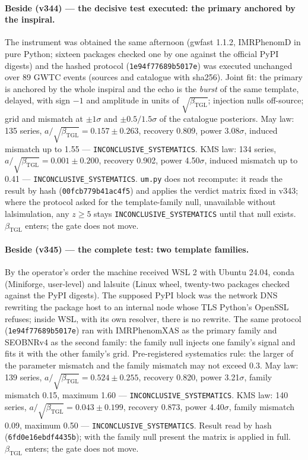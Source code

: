 \documentclass[11pt]{article}
\newcommand{\bTGL}{\beta_{\mathrm{TGL}}}\newcommand{\Msun}{M_{\odot}}\newcommand{\TGL}{\mathrm{TGL}}
\theoremstyle{definition}\newtheorem{deriv}{Derivation}
\begin{document}
\paragraph*{Beside (v344) --- the decisive test executed: the primary anchored by the inspiral.} The instrument was obtained the same afternoon (gwfast 1.1.2, IMRPhenomD in pure Python; sixteen packages checked one by one against the official PyPI digests) and the hashed protocol (\texttt{1e94f77689b5017e}) was executed unchanged over 89 GWTC events (sources and catalogue with sha256). Joint fit: the primary is anchored by the whole inspiral and the echo is the \emph{burst} of the same template, delayed, with sign $-1$ and amplitude in units of $\sqrt{\bTGL}$; injection nulls off-source; grid and mismatch at $\pm1\sigma$ and $\pm0.5/1.5\sigma$ of the catalogue posteriors. May law: 135 series, $a/\sqrt{\bTGL}=0.157\pm0.263$, recovery 0.809, power 3.08$\sigma$, induced mismatch up to 1.55 --- \texttt{INCONCLUSIVE\_SYSTEMATICS}. KMS law: 134 series, $a/\sqrt{\bTGL}=0.001\pm0.200$, recovery 0.902, power 4.50$\sigma$, induced mismatch up to 0.41 --- \texttt{INCONCLUSIVE\_SYSTEMATICS}. \texttt{um.py} does not recompute: it reads the result by hash (\texttt{00fcb779b41ac4f5}) and applies the verdict matrix fixed in v343; where the protocol asked for the template-family null, unavailable without lalsimulation, any $z\geq5$ stays \texttt{INCONCLUSIVE\_SYSTEMATICS} until that null exists. $\bTGL$ enters; the gate does not move.

\paragraph*{Beside (v345) --- the complete test: two template families.} By the operator's order the machine received WSL 2 with Ubuntu 24.04, conda (Miniforge, user-level) and lalsuite (Linux wheel, twenty-two packages checked against the PyPI digests). The supposed PyPI block was the network DNS rewriting the package host to an internal node whose TLS Python's OpenSSL refuses; inside WSL, with its own resolver, there is no rewrite. The same protocol (\texttt{1e94f77689b5017e}) ran with IMRPhenomXAS as the primary family and SEOBNRv4 as the second family: the family null injects one family's signal and fits it with the other family's grid. Pre-registered systematics rule: the larger of the parameter mismatch and the family mismatch may not exceed $0.3$. May law: 139 series, $a/\sqrt{\bTGL}=0.524\pm0.255$, recovery 0.820, power 3.21$\sigma$, family mismatch 0.15, maximum 1.60 --- \texttt{INCONCLUSIVE\_SYSTEMATICS}. KMS law: 140 series, $a/\sqrt{\bTGL}=0.043\pm0.199$, recovery 0.873, power 4.40$\sigma$, family mismatch 0.09, maximum 0.50 --- \texttt{INCONCLUSIVE\_SYSTEMATICS}. Result read by hash (\texttt{6fd0e16ebdf4435b}); with the family null present the matrix is applied in full. $\bTGL$ enters; the gate does not move.
\end{document}
